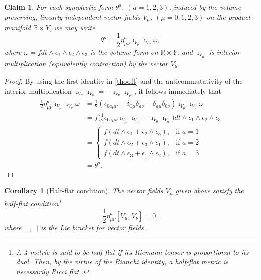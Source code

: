\documentclass[a4paper,onecolumn,12pt]{article}
\newtheorem{cor}[thm]{Corollary}
\newtheorem{claim}[thm]{Claim}
\theoremstyle{definition}
\theoremstyle{remark}
\newcommand{\e}{\epsilon}
\newcommand{\hooft}{\bar{\eta}}
\begin{document}
\begin{claim}
	For each symplectic form $\theta^{a}$, $(a=1,2,3)$, induced by the volume-preserving, linearly-independent vector fields $V_{\mu}$, $(\mu = 0,1,2,3)$ on the product manifold $\mathbb{R}\times Y$, we may write
	\begin{equation}
	\theta^{a} = \frac{1}{2}\hooft^{a}_{\mu\nu}\imath_{V_{\mu}}\imath_{V_{\nu}}\omega,
	\end{equation}
	where $\omega = f dt \wedge \epsilon_{1}\wedge \epsilon_{2} \wedge \epsilon_{3}$ is the volume form on $\mathbb{R}\times Y$, and $\imath_{V_{\mu}}$ is interior multiplication (equivalently contraction) by the vector $V_{\mu}$.
\end{claim}
\begin{proof}
	By using the first identity in \ref{thooft} and the anticommutativity of the interior multiplication $\imath_{V_{\mu}}\imath_{V_{\nu}} = -\imath_{V_{\nu}}\imath_{V_{\mu}}$, it follows immediately that
	\begin{align*}
		\frac{1}{2}\hooft^{a}_{\mu\nu}\imath_{V_{\mu}}\imath_{V_{\nu}}\omega 
		&= \frac{1}{2}(\epsilon_{0 a\mu\nu} + \delta_{0\mu}\delta_{a\nu} - \delta_{a\mu}\delta_{0\nu})\imath_{V_{\mu}}\imath_{V_{\nu}}\omega\\
		&= f\Big(\frac{1}{2}\epsilon_{0 a\mu\nu}\imath_{V_{\mu}}\imath_{V_{\nu}} + \imath_{V_{0}}\imath_{V_{a}}\Big)dt\wedge\epsilon_{1}\wedge\epsilon_{2}\wedge\epsilon_{3}\\
		&=
		\begin{cases}
		f(dt \wedge \e_{1} +  \e_{2}\wedge \e_{3}) ,& \text{if } a = 1\\
		f(dt \wedge \e_{2} +  \e_{3}\wedge \e_{1}) ,& \text{if } a = 2\\
		f(dt \wedge \e_{3} +  \e_{1}\wedge \e_{2}) ,& \text{if } a = 3
		\end{cases}\\
		&= \theta^{a}.
	\end{align*}
\end{proof}

\begin{cor}[Half-flat condition]
	The vector fields $V_{\mu}$ given above satisfy the half-flat condition\footnote{A 4-metric is said to be \emph{half-flat} if its Riemann tensor is proportional to its dual. Then, by the virtue of the Bianchi identity, a half-flat metric is necessarily Ricci flat \cite{ashtekar_1988}.}
	\begin{equation}
		\frac{1}{2}\hooft^{a}_{\mu\nu}[V_{\mu},V_{\nu}] = 0,
	\end{equation}
	where $[$\ $,$\ $]$ is the Lie bracket for vector fields.
\end{cor}
\end{document}
